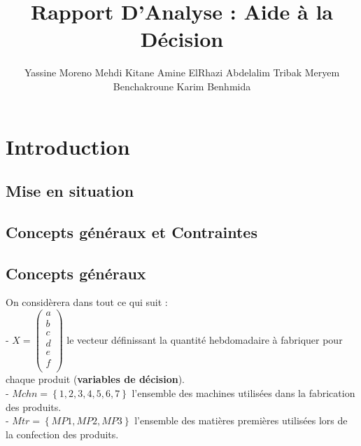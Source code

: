 \documentclass[a4paper, 11pt]{article}
\title{Rapport D'Analyse : Aide à la Décision}
\author{Yassine Moreno \cr Mehdi Kitane \cr Amine ElRhazi \cr Abdelalim Tribak \cr Meryem Benchakroune \cr Karim Benhmida}
\begin{document}
\begin{LARGE}
\maketitle
\end{LARGE}

\tableofcontents
\newpage

\section{Introduction}
\subsection{Mise en situation}
\subsection{Concepts généraux et Contraintes}
\subsection*{Concepts généraux}
On considèrera dans tout ce qui suit : \\
- $X = \begin{pmatrix}
        a\\
        b\\
        c\\
        d\\
        e\\
        f\\
    \end{pmatrix}$ le vecteur définissant la quantité hebdomadaire à fabriquer pour chaque produit (\textbf{variables de décision}).\\
- $Mchn = \left\{1, 2, 3, 4, 5, 6, 7\right\}$ l'ensemble des machines utilisées dans la fabrication des produits.\\
- $Mtr = \left\{MP1,MP2,MP3\right\}$ l'ensemble des matières premières utilisées lors de la confection des produits.\\
\end{document}
